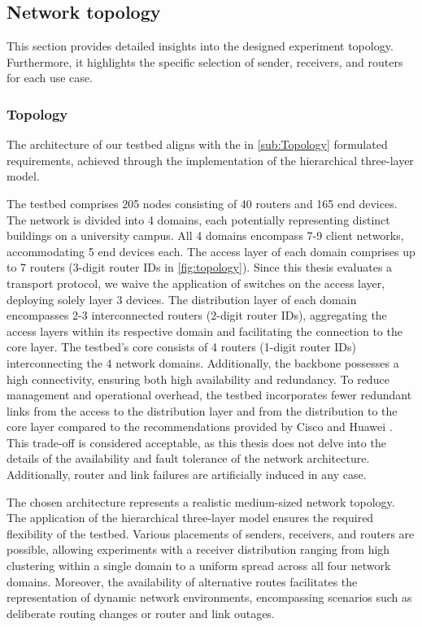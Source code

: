 \subsection{Network topology} %
\label{sub:Network Topology}
This section provides detailed insights into the designed experiment topology.
Furthermore, it highlights the specific selection of sender, receivers, and
    routers for each use case.

\subsubsection{Topology} %
\label{sec:Topology}
The architecture of our testbed aligns with the in \autoref{sub:Topology}
    formulated requirements, achieved through the implementation of the
    hierarchical three-layer model.

The testbed comprises 205 nodes consisting of 40 routers and 165 end devices.
The network is divided into 4 domains, each potentially representing distinct
    buildings on a university campus.
All 4 domains encompass 7-9 client networks, accommodating 5 end devices each.
The access layer of each domain comprises up to 7 routers (3-digit router IDs
    in \autoref{fig:topology}).
Since this thesis evaluates a transport protocol, we waive the application of
    switches on the access layer, deploying solely  layer 3 devices.
The distribution layer of each domain encompasses 2-3 interconnected routers
    (2-digit router IDs), aggregating the access layers within its respective
    domain and facilitating the connection to the core layer.
The testbed's core consists of 4 routers (1-digit router IDs) interconnecting
    the 4 network domains.
Additionally, the backbone possesses a high connectivity, ensuring both high
    availability and redundancy.
To reduce management and operational overhead, the testbed incorporates fewer
    redundant links from the access to the distribution layer and from the
    distribution to the core layer compared to the recommendations provided by
    Cisco and Huawei \cite{cisco_design_guide,huawei_campus_net}.
This trade-off is considered acceptable, as this thesis does not delve into the
    details of the availability and fault tolerance of the network
    architecture.
Additionally, router and link failures are artificially induced in any case.

The chosen architecture represents a realistic medium-sized network topology.
The application of the hierarchical three-layer model ensures the required
    flexibility of the testbed.
Various placements of senders, receivers, and routers are possible, allowing
    experiments with a receiver distribution ranging from high clustering
    within a single domain to a uniform spread across all four network domains.
Moreover, the availability of alternative routes facilitates the representation
    of dynamic network environments, encompassing scenarios such as deliberate
    routing changes or router and link outages.

